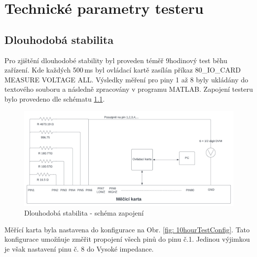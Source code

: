 \chapter{Technické parametry testeru} \label{tehcnical parameters}
\section{Dlouhodobá stabilita}
Pro zjištění dlouhodobé stability byl proveden téměř 9hodinový test běhu zařízení. Kde
každých 500\,ms byl ovládací kartě zasílán příkaz 80\_IO\_CARD MEASURE VOLTAGE ALL.
Výsledky měření pro piny 1 až 8 byly ukládány do textového souboru a následně zpracovány v programu MATLAB.
Zapojení testeru bylo provedeno dle schématu \ref{fig: 10hourTestScheme}.

\begin{figure}[ht!]
    \centering
    \includegraphics[width = 1\textwidth]{obrazky/10hourTestScheme.png}
    \caption{Dlouhodobá stabilita - schéma zapojení}
    \label{fig: 10hourTestScheme}
\end{figure}

Měřící karta byla nastavena do konfigurace na Obr. \ref{fig: 10hourTestConfig}. Tato konfigurace
umožňuje změřit propojení všech pinů do pinu č.1. Jedinou výjimkou je však nastavení pinu č. 8 do Vysoké impedance.

